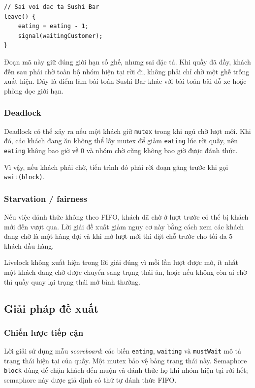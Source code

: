 \begin{lstlisting}
// Sai voi dac ta Sushi Bar
leave() {
    eating = eating - 1;
    signal(waitingCustomer);
}
\end{lstlisting}

Đoạn mã này giữ đúng giới hạn số ghế, nhưng sai đặc tả. Khi quầy đã đầy, khách
đến sau phải chờ toàn bộ nhóm hiện tại rời đi, không phải chỉ chờ một ghế trống
xuất hiện. Đây là điểm làm bài toán Sushi Bar khác với bài toán bãi đỗ xe hoặc
phòng đọc giới hạn.

\subsubsection*{Deadlock}

Deadlock có thể xảy ra nếu một khách giữ \texttt{mutex} trong khi ngủ chờ lượt
mới. Khi đó, các khách đang ăn không thể lấy mutex để giảm \texttt{eating} lúc
rời quầy, nên \texttt{eating} không bao giờ về 0 và nhóm chờ cũng không bao
giờ được đánh thức.

Vì vậy, nếu khách phải chờ, tiến trình đó phải rời đoạn găng trước khi gọi
\texttt{wait(block)}.

\subsubsection*{Starvation / fairness}

Nếu việc đánh thức không theo FIFO, khách đã chờ ở lượt trước có thể bị khách
mới đến vượt qua. Lời giải đề xuất giảm nguy cơ này bằng cách xem các khách
đang chờ là một hàng đợi và khi mở lượt mới thì đặt chỗ trước cho tối đa 5
khách đầu hàng.

Livelock không xuất hiện trong lời giải đúng vì mỗi lần lượt được mở, ít nhất
một khách đang chờ được chuyển sang trạng thái ăn, hoặc nếu không còn ai chờ thì
quầy quay lại trạng thái mở bình thường.

\subsection{Giải pháp đề xuất}

\subsubsection*{Chiến lược tiếp cận}

Lời giải sử dụng mẫu \textit{scoreboard}: các biến \texttt{eating},
\texttt{waiting} và \texttt{mustWait} mô tả trạng thái hiện tại của quầy. Một
mutex bảo vệ bảng trạng thái này. Semaphore \texttt{block} dùng để chặn khách
đến muộn và đánh thức họ khi nhóm hiện tại rời hết; semaphore này được giả định
có thứ tự đánh thức FIFO.


